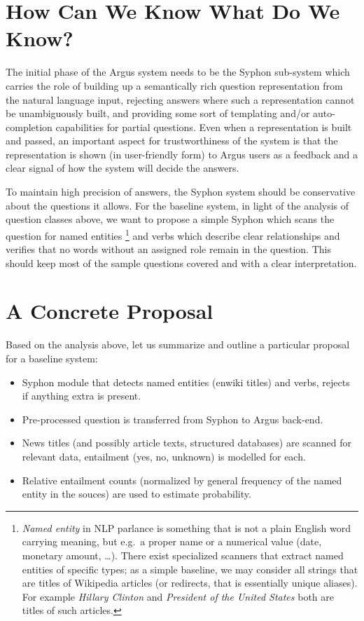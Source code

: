 \documentclass[11pt,a4paper]{article}
\begin{document}
\section{How Can We Know What Do We Know?}
\label{syphon}

The initial phase of the Argus system needs to be the Syphon sub-system
which carries the role of building up a semantically rich question
representation from the natural language input, rejecting answers where
such a representation cannot be unambiguously built, and providing
some sort of templating and/or auto-completion capabilities for partial
questions.  Even when a representation is built and passed, an important
aspect for trustworthiness of the system is that the representation is
shown (in user-friendly form) to Argus users as a feedback and a clear
signal of how the system will decide the answers.

To maintain high precision of answers, the Syphon system should be
conservative about the questions it allows.  For the baseline system,
in light of the analysis of question classes above,
we want to propose a simple Syphon which scans the question
for named entities%
\footnote{\textit{Named entity} in NLP parlance is something that is
	not a plain English word carrying meaning, but e.g.\ a proper
	name or a numerical value (date, monetary amount, \dots).
	There exist specialized scanners that extract named entities
	of specific types; as a simple baseline, we may consider
	all strings that are titles of Wikipedia articles (or redirects,
	that is essentially unique aliases).  For example
	\textit{Hillary Clinton} and \textit{President of the United States}
	both are titles of such articles.}
	and verbs which describe clear relationships
	and verifies that no words without an assigned role remain
	in the question.  This should keep most of the sample questions
	covered and with a clear interpretation.

\section{A Concrete Proposal}
\label{system}

Based on the analysis above, let us summarize and outline a particular
proposal for a baseline system:

\begin{itemize}
	\item Syphon module that detects named entities (enwiki titles) and verbs, rejects if anything extra is present.
	\item Pre-processed question is transferred from Syphon to Argus back-end.
	\item News titles (and possibly article texts, structured databases) are scanned for relevant data, entailment (yes, no, unknown) is modelled for each.
	\item Relative entailment counts (normalized by general frequency of the named entity in the souces) are used to estimate probability.
\end{itemize}
\end{document}
